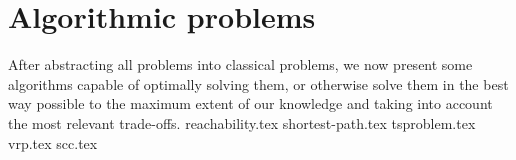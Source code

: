 \chapter{Algorithmic problems} \label{algorithm}
After abstracting all problems into classical problems, we now present some algorithms capable of optimally solving them, or otherwise solve them in the best way possible to the maximum extent of our knowledge and taking into account the most relevant trade-offs.
{reachability.tex}
{shortest-path.tex}
{tsproblem.tex}
{vrp.tex}
{scc.tex}
